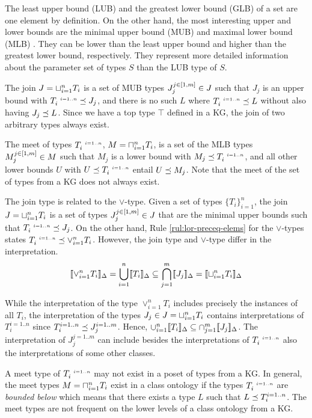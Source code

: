 \documentclass[runningheads]{llncs}
\newcommand{\s}{\scriptscriptstyle\ \,}
\newcommand{\llb}{\llbracket}
\newcommand{\rrb}{\rrbracket}
\newcommand{\DD}{{\Delta}}
\newcommand{\memo}[1]{}
\begin{document}
The least upper bound (LUB) and the greatest lower bound (GLB) of a
set are one element by definition. On the other hand, the most
interesting upper and lower bounds are the minimal upper bound (MUB)
and maximal lower bound (MLB) \cite{Knudstorp2024}. They can be lower
than the least upper bound and higher than the greatest lower bound,
respectively. They represent more detailed information about the
parameter set of types $S$ than the LUB type of $S$.

\memo{Add detailed justification of using MUB and MLB.}

The join $J=\sqcup_{i=1}^n\/T_i$ is a set of MUB types
$J_j^{j\in[1,m]}\in\/J$ such that $J_j$ is an upper bound with
$T_i^{\s\/i=1..n}\preceq\/J_j$, and there is no such $L$ where
$T_i^{\s\/i=1..n}\preceq\/L$ without also having
$J_j\preceq\/L$. Since we have a top type $\top$ defined in a KG, the
join of two arbitrary types always exist.

The meet of types $T_i^{\s\/i=1..n}$, $M=\sqcap_{i=1}^n\/T_i$, is a
set of the MLB types $M_j^{j\in[1,m]}\in\/M$
such that $M_j$ is a lower bound with $M_j\preceq\/T_i^{\s\/i=1..n}$,
and all other lower bounds $U$ with $U\preceq\/T_i^{\s\/i=1..n}$
entail $U\preceq\/M_j$. Note that the meet of the set of types from a
KG does not always exist.

The join type is related to the $\lor$-type. Given a set of types
$\{T_i\}_{i=1}^n$, the join $J=\sqcup_{i=1}^n\/T_i$ is a set of types
$J_j^{j\in[1,m]}\in\/J$ that are the minimal upper bounds such that
$T_i^{\s\/i=1..n}\preceq\/J_j$. On the other hand, Rule
\ref{rul:lor-preceq-elems} for the $\lor$-types states
$T_i^{\s\/i=1..n}\preceq\lor_{i=1}^n\/T_i$. However, the join type and
$\lor$-type differ in the interpretation.
$$\llb\lor_{i=1}^n\/T_i\rrb_\DD=\bigcup_{i=1}^n\llb\/T_i\rrb_\DD\subseteq\bigcap_{j=1}^m\llb\/J_j\rrb_\DD=\llb\sqcup_{i=1}^n\/T_i\rrb_\DD$$

While the interpretation of the type $\lor_{i=1}^nT_i$ includes
precisely the instances of all $T_i$, the interpretation of the types
$J_j\in\/J=\sqcup_{i=1}^n\/T_i$ contains interpretations of
$T_i^{i=1..n}$ since $T_i^{i=1..n}\preceq\/J_j^{i=1..m}$. Hence,
$\cup_{i=1}^n\llb\/T_i\rrb_\DD\subseteq\cap_{j=1}^m\llb\/J_j\rrb_\DD$. The
interpretation of $J_j^{j=1..m}$ can include besides the
interpretations of $T_i^{\s\/i=1..n}$ also the interpretations of some
other classes.

A meet type of $T_i^{\s\/i=1..n}$ may not exist in a poset of types
from a KG. In general, the meet types $M=\sqcap_{i=1}^n\/T_i$ exist in
a class ontology if the types $T_i^{\s\/i=1..n}$ are \emph{bounded
  below} \cite{Pierce2002} which means that there exists a type $L$
such that $L\preceq\/T_i^{i=1..n}$. The meet types are not frequent
on the lower levels of a class ontology from a KG.
\end{document}
